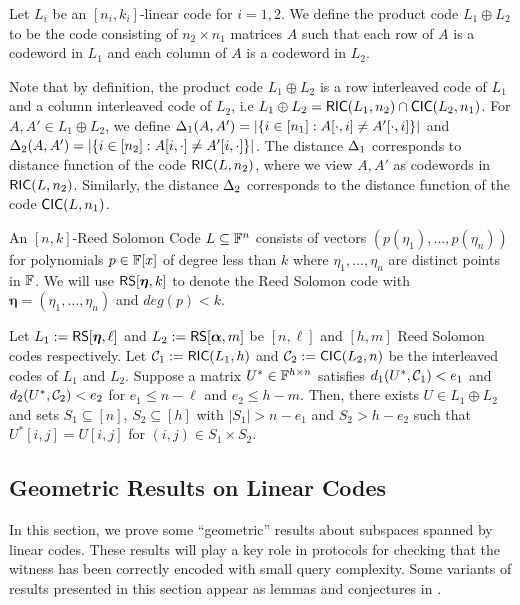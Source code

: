 \begin{definition}\label{defn:productcode}
Let $L_i$ be an $[n_i,k_i]$-linear code for $i=1,2$. We define the product code $L_1\oplus L_2$  to be the code consisting of $n_2\times n_1$ matrices $A$ such that each row of $A$ is a codeword in $L_1$ and each column of $A$ is a codeword in $L_2$. 
\end{definition}

Note that by definition, the product code $L_1\oplus L_2$ is a row interleaved code of $L_1$ and a column interleaved code of $L_2$, i.e $L_1\oplus L_2 =
\mathsf{RIC}(L_1,n_2)\cap \mathsf{CIC}(L_2,n_1)$. For $A,A'\in L_1\oplus L_2$, we define $\Delta_1(A,A')=|\{i\in [n_1]: A[\cdot,i]\neq A'[\cdot,i]\}|$ and $\Delta_2(A,A')=|\{i\in
[n_2]: A[i,\cdot]\neq A'[i,\cdot]\}|$. The distance $\Delta_1$ corresponds to distance function of the code $\mathsf{RIC}(L,n_2)$, where we view $A,A'$ as codewords in $\mathsf{RIC}(L,n_2)$. Similarly, the distance $\Delta_2$ corresponds to the distance function of the code $\mathsf{CIC}(L,n_1)$.

\begin{definition}\label{defn:rscode}
An $[n,k]$-Reed Solomon Code $L\subseteq \mathbb{F}^n$ consists of vectors $(p(\eta_1),\ldots,p(\eta_n))$ for polynomials $p\in \mathbb{F}[x]$ of degree less than $k$ where $\eta_1,\ldots,\eta_n$ are distinct points in $\mathbb{F}$. We will use $\mathsf{RS}[\bm{\eta},k]$ to denote the Reed Solomon code with $\bm{\eta}=(\eta_1,\ldots,\eta_n)$ and $deg(p)<k$.
\end{definition}

\begin{lemma}\label{lem:bicdecoding}
Let $L_1 := \mathsf{RS}[\bm{\eta},\ell]$ and $L_2 := \mathsf{RS}[\bm{\alpha},m]$ be $[n,\ell]$ and
$[h,m]$ Reed Solomon codes respectively. Let $\mathcal{C}_1 := \mathsf{RIC}(L_1,h)$ and
$\mathcal{C}_2 := \mathsf{CIC}(L_2,n)$ be the interleaved codes of $L_1$ and $L_2$. Suppose
a matrix $U^\ast\in \mathbb{F}^{h\times n}$ satisfies $d_1(U^\ast,\mathcal{C}_1)<e_1$ and
$d_2(U^\ast,\mathcal{C}_2)<e_2$ for $e_1\leq n-\ell$ and $e_2\leq h-m$. Then, there exists $U\in L_1\oplus L_2$ and sets
$S_1\subseteq [n]$, $S_2\subseteq [h]$ with $|S_1|>n-e_1$ and $S_2>h-e_2$ such
that $U^\ast[i,j]=U[i,j]$ for $(i,j)\in S_1\times S_2$.
\end{lemma}
 

\subsection{Geometric Results on Linear Codes}
In this section, we prove some ``geometric'' results about subspaces spanned by linear codes. 
These results will play a key role in protocols for checking that the witness has been correctly encoded with small query complexity. Some variants of results presented in this section appear as lemmas and conjectures in \cite[Section 4]{ligero}.

